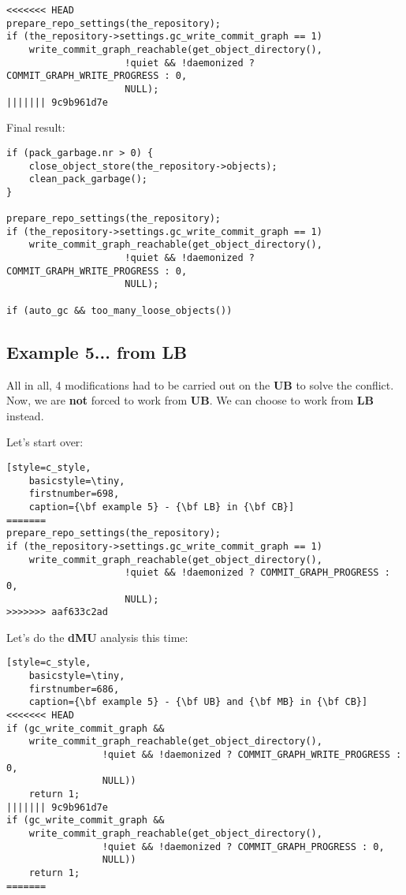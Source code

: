\begin{lstlisting}[style=c_style,
	basicstyle=\tiny,
	firstnumber=686,
	caption={\bf example 5} - Step 4 - Remove return]
<<<<<<< HEAD
prepare_repo_settings(the_repository);
if (the_repository->settings.gc_write_commit_graph == 1)
	write_commit_graph_reachable(get_object_directory(),
				     !quiet && !daemonized ? COMMIT_GRAPH_WRITE_PROGRESS : 0,
				     NULL);
||||||| 9c9b961d7e
\end{lstlisting}

Final result:
\begin{lstlisting}[style=c_style,
	basicstyle=\tiny,
	firstnumber=681,
	caption={\bf example 5} - final result]
if (pack_garbage.nr > 0) {
	close_object_store(the_repository->objects);
	clean_pack_garbage();
}

prepare_repo_settings(the_repository);
if (the_repository->settings.gc_write_commit_graph == 1)
	write_commit_graph_reachable(get_object_directory(),
				     !quiet && !daemonized ? COMMIT_GRAPH_WRITE_PROGRESS : 0,
				     NULL);

if (auto_gc && too_many_loose_objects())
\end{lstlisting}

\subsection{Example 5... from LB}

All in all, 4 modifications had to be carried out on the {\bf UB} to solve the conflict. Now, we are {\bf not}
forced to work from {\bf UB}. We can choose to work from {\bf LB} instead.

Let's start over:

\begin{lstlisting}[style=c_style,
	basicstyle=\tiny,
	firstnumber=698,
	caption={\bf example 5} - {\bf LB} in {\bf CB}]
=======
prepare_repo_settings(the_repository);
if (the_repository->settings.gc_write_commit_graph == 1)
	write_commit_graph_reachable(get_object_directory(),
				     !quiet && !daemonized ? COMMIT_GRAPH_PROGRESS : 0,
				     NULL);
>>>>>>> aaf633c2ad
\end{lstlisting}

Let's do the {\bf dMU} analysis this time:

\begin{lstlisting}[style=c_style,
	basicstyle=\tiny,
	firstnumber=686,
	caption={\bf example 5} - {\bf UB} and {\bf MB} in {\bf CB}]
<<<<<<< HEAD
if (gc_write_commit_graph &&
    write_commit_graph_reachable(get_object_directory(),
				 !quiet && !daemonized ? COMMIT_GRAPH_WRITE_PROGRESS : 0,
				 NULL))
	return 1;
||||||| 9c9b961d7e
if (gc_write_commit_graph &&
    write_commit_graph_reachable(get_object_directory(),
				 !quiet && !daemonized ? COMMIT_GRAPH_PROGRESS : 0,
				 NULL))
	return 1;
=======
\end{lstlisting}

